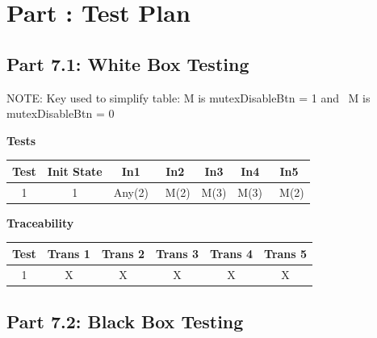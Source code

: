 \documentclass{article}
\newcounter{partNum}
\newcommand{\partNum}{%
        \stepcounter{partNum}%
        \thepartNum}
\newcommand{\sectPart}[1]{\section*{Part \partNum: #1}}
\begin{document}

\sectPart{Test Plan}

\subsection*{Part 7.1: White Box Testing}

NOTE: Key used to simplify table: M is mutexDisableBtn = 1 and ~M is mutexDisableBtn = 0

\vspace*{2em}

\begin{center}
    \textbf{Tests}\\
    \begin{tabular}{c | c | c | c | c | c | c}
    Test & Init State & In1 & In2 & In3 & In4 & In5 \\ \hline
    1 & 1 & Any(2) & ~M(2) & M(3) & M(3) & ~M(2) \\
    \end{tabular}
\end{center}

\vspace*{2em}

\begin{center}
    \textbf{Traceability} \\
    \begin{tabular}{c | c | c | c | c | c}
    Test & Trans 1 & Trans 2 & Trans 3 & Trans 4 & Trans 5 \\ \hline
    1 & X & X & X & X & X \\
    \end{tabular}
\end{center}

\subsection*{Part 7.2: Black Box Testing}
\end{document}
